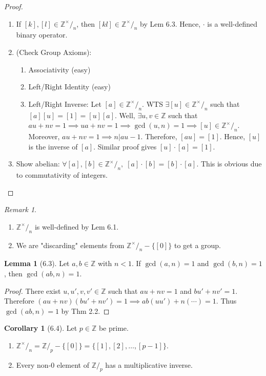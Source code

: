 \documentclass{article}
\newcommand{\Z}{\ensuremath{\mathbb{Z}}}
\newcommand{\Zn}[1]{\ensuremath{\mathbb{Z}/_#1}}
\newcommand{\Znx}[1]{\ensuremath{\mathbb{Z}^\times/_#1}}
\theoremstyle{definition}
\newtheorem*{cor}{Corollary}
\newtheorem*{lem}{Lemma}
\theoremstyle{remark}
\newtheorem*{rmk}{Remark}
\begin{document}
{{        \begin{proof}\hfill
            \begin{enumerate}
                \item If $[k],[l] \in \Znx{n}$, then $[kl] \in \Znx{n}$ by Lem 6.3. Hence, $\cdot$ is a well-defined binary operator.
                \item (Check Group Axioms):
                    \begin{enumerate}
                        \item Associativity (easy)
                        \item Left/Right Identity (easy)
                        \item Left/Right Inverse: Let $[a] \in \Znx{n}$. WTS $\exists [u] \in \Znx{n}$ such that $[a][u]=[1]=[u][a]$. Well, $\exists u,v \in \Z$ such that $au+nv=1 \implies ua+nv=1 \implies \gcd(u,n)=1 \implies [u] \in \Znx{n}$. Moreover, $au+nv=1 \implies n|au-1$. Therefore, $[au]=[1]$. Hence, $[u]$ is the inverse of $[a]$. Similar proof gives $[u]\cdot[a]=[1]$.
                    \end{enumerate}
                \item Show abelian: $\forall [a],[b] \in \Znx{n}, \; [a]\cdot[b]=[b]\cdot[a]$. This is obvious due to commutativity of integers.
            \end{enumerate}
        \end{proof}
        
        \begin{rmk}\hfill
            \begin{enumerate}
                \item $\Znx{n}$ is well-defined by Lem 6.1.
                \item We are "discarding" elements from $\Znx{n}-\{[0]\}$ to get a group.
            \end{enumerate}
        \end{rmk}
        
        \begin{lem}[6.3]
            Let $a,b \in \Z$ with $n<1$. If $\gcd(a,n)=1$ and $\gcd(b,n)=1$, then $\gcd(ab,n)=1$.
        \end{lem}
        
        \begin{proof}
            There exist $u,u',v,v' \in \Z$ such that $au+nv=1$ and $bu'+nv'=1$. Therefore $(au+nv)(bu'+nv')=1 \implies ab(uu')+n(\cdots)=1$. Thus $\gcd(ab,n)=1$ by Thm 2.2.
        \end{proof}
        }
        
        \begin{cor}[6.4]
            Let $p \in \Z$ be prime.
            \begin{enumerate}
                \item $\Znx{n}=\Zn{p}-\{[0]\}=\{[1],[2],\ldots,[p-1]\}$.
                \item Every non-0 element of $\Zn{p}$ has a multiplicative inverse.
            \end{enumerate}
        \end{cor}
    }
    
\end{document}
